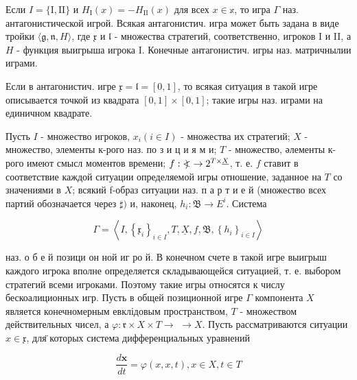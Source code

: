 \documentclass[10pt]{article}
\newcommand\Varangle{\mathop{{<\!\!\!\!\!\text{\small)}}\:}\nolimits}
\begin{document}
Если $I=\{\mathrm{I}, \mathrm{II}\}$ и $H_{\mathrm{I}}(x)=-H_{\mathrm{II}}(x)$ для всех $x \in \mathbb{x}$, то игра $\Gamma$ наз. антагонистической игрой. Всякая антагонистич. игра может быть задана в виде тройки $\langle\mathfrak{g}, \mathfrak{n}, H\rangle$, где $\mathfrak{x}$ и $\mathfrak{l}$ - множества стратегий, соответственно, игроков I и II, а $H$ - функция выигрыша игрока I. Конечные антагонистич. игры наз. матричнылии играми.



Если в антагонистич. игре $\mathfrak{x}=\mathfrak{l}=[0,1]$, то всякая ситуация в такой игре описывается точкой из квадрата $[0,1] \times[0,1]$; такие игры наз. играми на единичном квадрате.



Пусть $I$ - множество игроков, $x_{i}(i \in I)$ - множества их стратегий; $X$ - множество, элементы к-рого наз. по з и ц и я м и; $T$ - множество, әлементы к-рого имеют смысл моментов времени; $f: \mathfrak{\Varangle} \rightarrow 2^{T \times \underline{X}}$, т. е. $f$ ставит в соответствие каждой ситуации определяемой игры отношение, заданное на $T$ со значениями в $X$; всякий f-образ ситуации наз. п а р т и е й (множество всех партий обозначается через $\mathfrak{\sharp})$ и, наконец, $h_{i}: \mathfrak{B} \rightarrow E^{i}$. Система



\[

\Gamma=\left\langle I,\left\{\mathfrak{x}_{i}\right\}_{i \in I}, T, \underline{X}, f, \mathfrak{B},\left\{h_{i}\right\}_{i \in I}\right\rangle

\]



наз. о б е й позици он ной иг ро й. В конечном счете в такой игре выигрыш каждого игрока вполне определяется складывающейся ситуацией, т. е. выбором стратегий всеми игроками. Поэтому такие игры относятся к числу бескоалиционных игр. Пусть в общей позиционной игре $\Gamma$ компонента $X$ является конечномерным евклідовым пространством, $T$ - множеством действительных чисел, а $\varphi: \mathfrak{r} \times X \times T \rightarrow$ $\rightarrow X$. Пусть рассматриваются ситуации $x \in \mathfrak{x}$, для̈ которых система дифференциальных уравнений



\[

\frac{d \boldsymbol{x}}{d t}=\varphi(x, x, t), x \in X, t \in T

\]
\end{document}
